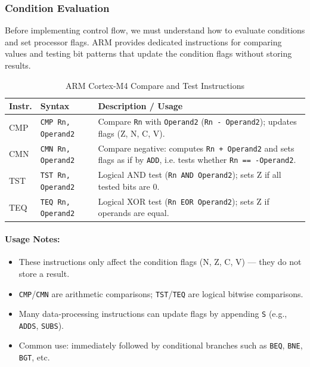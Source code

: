 \subsubsection{Condition Evaluation}
Before implementing control flow, we must understand how to evaluate conditions and set processor flags. ARM provides dedicated instructions for comparing values and testing bit patterns that update the condition flags without storing results.

\begin{table}[H]
\centering
\caption{ARM Cortex-M4 Compare and Test Instructions}
\small
\begin{tabularx}{\linewidth}{@{}l l X@{}}
\toprule
\textbf{Instr.} & \textbf{Syntax} & \textbf{Description / Usage} \\
\midrule
CMP     & \texttt{CMP Rn, Operand2}   & Compare \texttt{Rn} with \texttt{Operand2} (\texttt{Rn - Operand2}); updates flags (Z, N, C, V). \\
CMN     & \texttt{CMN Rn, Operand2}   & Compare negative: computes \texttt{Rn + Operand2} and sets flags as if by \texttt{ADD}, i.e. tests whether \texttt{Rn == -Operand2}. \\
TST     & \texttt{TST Rn, Operand2}   & Logical AND test (\texttt{Rn AND Operand2}); sets Z if all tested bits are 0. \\
TEQ     & \texttt{TEQ Rn, Operand2}   & Logical XOR test (\texttt{Rn EOR Operand2}); sets Z if operands are equal. \\
\bottomrule
\end{tabularx}
\end{table}

\paragraph{Usage Notes:}
\begin{itemize}[nosep]
  \item These instructions only affect the condition flags (N, Z, C, V) — they do not store a result.
  \item \texttt{CMP}/\texttt{CMN} are arithmetic comparisons; \texttt{TST}/\texttt{TEQ} are logical bitwise comparisons.
  \item Many data-processing instructions can update flags by appending \texttt{S} (e.g., \texttt{ADDS}, \texttt{SUBS}).
  \item Common use: immediately followed by conditional branches such as \texttt{BEQ}, \texttt{BNE}, \texttt{BGT}, etc.
\end{itemize}


